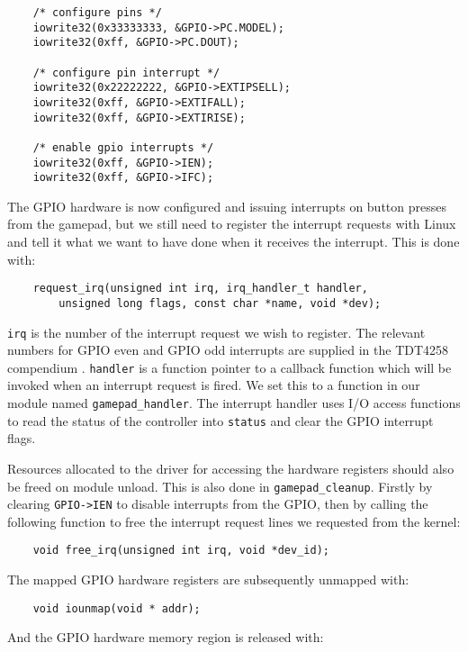 \begin{lstlisting}
	/* configure pins */
	iowrite32(0x33333333, &GPIO->PC.MODEL);
    iowrite32(0xff, &GPIO->PC.DOUT);

	/* configure pin interrupt */
    iowrite32(0x22222222, &GPIO->EXTIPSELL);
    iowrite32(0xff, &GPIO->EXTIFALL);
    iowrite32(0xff, &GPIO->EXTIRISE);

	/* enable gpio interrupts */
    iowrite32(0xff, &GPIO->IEN);
    iowrite32(0xff, &GPIO->IFC);
\end{lstlisting}

The GPIO hardware is now configured and issuing interrupts on button presses
from the gamepad, but we still need to register the interrupt requests with
Linux and tell it what we want to have done when it receives the interrupt. This
is done with:

\begin{lstlisting}
	request_irq(unsigned int irq, irq_handler_t handler,
		unsigned long flags, const char *name, void *dev);
\end{lstlisting}

\texttt{irq} is the number of the interrupt request we wish to register. The
relevant numbers for GPIO even and GPIO odd interrupts are supplied in the
TDT4258 compendium \cite{TDT4528Compendium}. \texttt{handler} is a function
pointer to a callback function which will be invoked when an interrupt request
is fired. We set this to a function in our module named
\texttt{gamepad\_handler}. The interrupt handler uses I/O access functions to
read the status of the controller into \texttt{status} and clear the GPIO
interrupt flags.

Resources allocated to the driver for accessing the hardware registers should
also be freed on module unload. This is also done in \texttt{gamepad\_cleanup}.
Firstly by clearing \texttt{GPIO->IEN} to disable interrupts from the GPIO, then
by calling the following function to free the interrupt request lines we
requested from the kernel:

\begin{lstlisting}
	void free_irq(unsigned int irq, void *dev_id);
\end{lstlisting}

The mapped GPIO hardware registers are subsequently unmapped with:

\begin{lstlisting}
	void iounmap(void * addr);
\end{lstlisting}

And the GPIO hardware memory region is released with:

